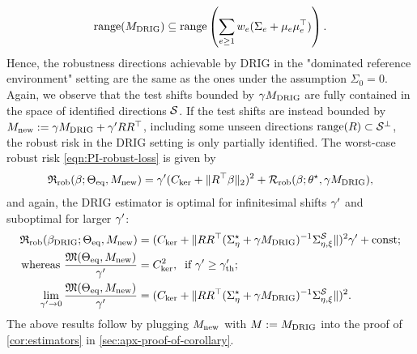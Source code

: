 \begin{align*}
\mathrm{range}(M_{\mathrm{DRIG}}) \subseteq \mathrm{range}\left( \sum_{e \geq 1} w_e (\Sigma_e + \mu_e \mu_e^\top) \right). 
\end{align*}
Hence, the robustness directions achievable by DRIG in the "dominated reference environment" setting are the same as the ones under the assumption $\Sigma_0 = 0$. \\
Again, we observe that the test shifts bounded by $\gamma M_{\mathrm{DRIG}}$ are fully contained in the space of identified directions $\mathcal{S}$. If the test shifts are instead bounded by $M_{\mathrm{new}} := \gamma M_{\mathrm{DRIG}} + \gamma' R R^\top$,  including some unseen directions $\mathrm{range}(R) \subset \mathcal{S}^\perp$, the robust risk in the DRIG setting is only partially identified. The worst-case robust risk \eqref{eqn:PI-robust-loss} is given by 
\begin{align*}
    \mathfrak{R}_{\mathrm{rob}}(\beta; \Theta_{\mathrm{eq}}, M_{\mathrm{new}}) = \gamma' (C_{\mathrm{ker}} + \| R^\top \beta \|_2)^2 + \mathcal{R}_{\mathrm{rob}}(\beta; \theta^{\star}, \gamma M_{\mathrm{DRIG}}),
\end{align*}
and again, the DRIG estimator is optimal for infinitesimal shifts $\gamma'$ and suboptimal for larger $\gamma'$:
\begin{equation*}
    \begin{aligned}
        \mathfrak{R}_{\mathrm{rob}}(\beta_{\mathrm{DRIG}}; \Theta_{\mathrm{eq}},M_{\mathrm{new}}) &= (C_{\mathrm{ker}} + \| R R^\top (\Sigma^\star_{\eta} + \gamma M_{\mathrm{DRIG}})^{-1} \Sigma^{\mathcal{S}}_{\eta,\xi} \| )^2 \gamma' + \text{const}; \\ 
\text{whereas }\frac{\mathfrak{M}(\Theta_{\mathrm{eq}}, M_{\mathrm{new}})}{\gamma'} &= C_{\mathrm{ker}}^2, \: \text{ if } \gamma' \geq \gamma'_{\mathrm{th}}; \\  \lim_{\gamma' \to 0} \frac{\mathfrak{M}(\Theta_{\mathrm{eq}}, M_{\mathrm{new}})}{\gamma'} &= (C_{\mathrm{ker}} + \| R R^\top (\Sigma^\star_{\eta} + \gamma M_{\mathrm{DRIG}})^{-1} \Sigma^{\mathcal{S}}_{\eta,\xi}\| )^2.
    \end{aligned}
\end{equation*}
The above results follow by plugging $M_{\mathrm{new}}$ with $M := M_{\mathrm{DRIG}}$ into the proof of \cref{cor:estimators} in \cref{sec:apx-proof-of-corollary}.





